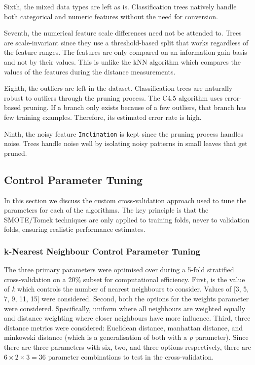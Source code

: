 \documentclass[conference]{IEEEtran}
\begin{document}
Sixth, the mixed data types are left as is. Classification trees natively handle both categorical and numeric features without the need for conversion.

Seventh, the numerical feature scale differences need not be attended to. Trees are scale-invariant since they use a threshold-based split that works regardless of the feature ranges. The features are only compared on an information gain basis and not by their values. This is unlike the kNN algorithm which compares the values of the features during the distance measurements.

Eighth, the outliers are left in the dataset. Classification trees are naturally robust to outliers through the pruning process. The C4.5 algorithm \cite{quinlan1993c45} uses error-based pruning. If a branch only exists because of a few outliers, that branch has few training examples. Therefore, its estimated error rate is high.

Ninth, the noisy feature \texttt{Inclination} is kept since the pruning process handles noise. Trees handle noise well by isolating noisy patterns in small leaves that get pruned.


\subsection{Control Parameter Tuning}
In this section we discuss the custom cross-validation approach used to tune the parameters for each of the algorithms. The key principle is that the SMOTE/Tomek techniques are only applied to training folds, never to validation folds, ensuring realistic performance estimates.
\subsubsection{k-Nearest Neighbour Control Parameter Tuning}
The three primary parameters were optimised over during a 5-fold stratified cross-validation on a 20\% subset for computational efficiency. First, is the value of \textit{k} which controls the number of nearest neighbours to consider. Values of [3, 5, 7, 9, 11, 15] were considered. Second, both the options for the weights parameter were considered. Specifically, uniform where all neighbours are weighted equally and distance weighting where closer neighbours have more influence. Third, three distance metrics were considered: Euclidean distance, manhattan distance, and minkowski distance (which is a generalisation of both with a \textit{p} parameter). Since there are three parameters with six, two, and three options respectively, there are $6 \times 2 \times 3 = 36$ parameter combinations to test in the cross-validation. 
	
\end{document}
